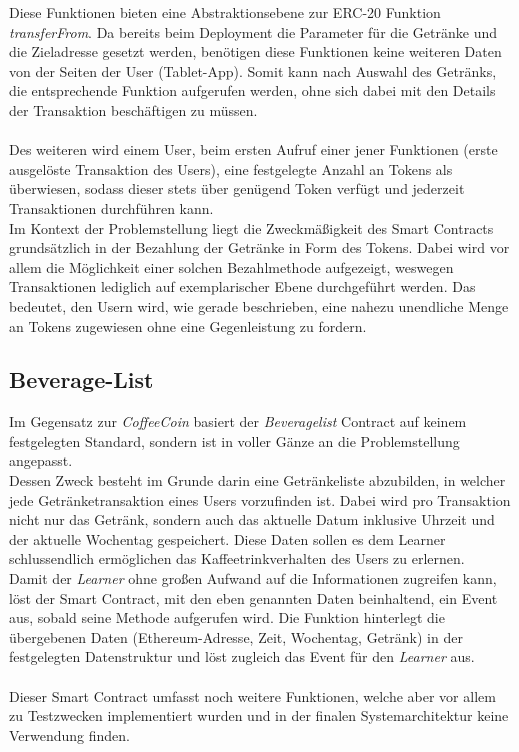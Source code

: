 Diese Funktionen bieten eine Abstraktionsebene zur ERC-20 Funktion \textit{transferFrom}. Da bereits beim Deployment die Parameter für die Getränke und die Zieladresse gesetzt werden, benötigen diese Funktionen keine weiteren Daten von der Seiten der User (Tablet-App). Somit kann nach Auswahl des Getränks, die entsprechende Funktion aufgerufen werden, ohne sich dabei mit den Details der Transaktion beschäftigen zu müssen.\\\\
Des weiteren wird einem User, beim ersten Aufruf einer jener Funktionen (erste ausgelöste Transaktion des Users), eine festgelegte Anzahl an Tokens als  überwiesen, sodass dieser stets über genügend Token verfügt und jederzeit Transaktionen durchführen kann.\\
Im Kontext der Problemstellung liegt die Zweckmäßigkeit des Smart Contracts grundsätzlich in der Bezahlung der Getränke in Form des Tokens. Dabei wird vor allem die Möglichkeit einer solchen Bezahlmethode aufgezeigt, weswegen Transaktionen lediglich auf exemplarischer Ebene durchgeführt werden. Das bedeutet, den Usern wird, wie gerade beschrieben, eine nahezu unendliche Menge an Tokens zugewiesen ohne eine Gegenleistung zu fordern.

\subsection{Beverage-List}
\label{subsec:bl}

Im Gegensatz zur \textit{CoffeeCoin} basiert der \textit{Beveragelist} Contract auf keinem festgelegten Standard, sondern ist in voller Gänze an die Problemstellung angepasst.\\
Dessen Zweck besteht im Grunde darin eine Getränkeliste abzubilden, in welcher jede Getränketransaktion eines Users vorzufinden ist. Dabei wird pro Transaktion nicht nur das Getränk, sondern auch das aktuelle Datum inklusive Uhrzeit und der aktuelle Wochentag gespeichert. Diese Daten sollen es dem Learner schlussendlich ermöglichen das Kaffeetrinkverhalten des Users zu erlernen. \\
Damit der \textit{Learner} ohne großen Aufwand auf die Informationen zugreifen kann, löst der Smart Contract, mit den eben genannten Daten beinhaltend, ein Event aus, sobald seine Methode  aufgerufen wird. Die Funktion hinterlegt die übergebenen Daten (Ethereum-Adresse, Zeit, Wochentag, Getränk) in der festgelegten Datenstruktur und löst zugleich das Event für den \textit{Learner} aus.\\\\
Dieser Smart Contract umfasst noch weitere Funktionen, welche aber vor allem zu Testzwecken implementiert wurden und in der finalen Systemarchitektur keine Verwendung finden. 

